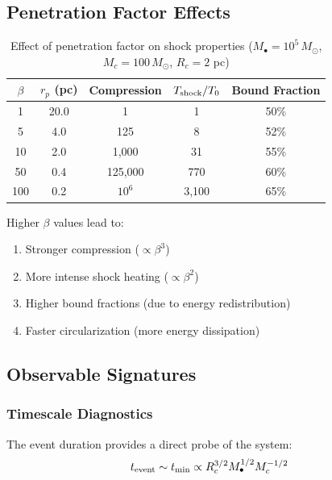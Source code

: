 \documentclass[twocolumn,amsmath,amssymb,prd,superscriptaddress,nofootinbib]{revtex4-2}
\begin{document}
\subsection{Penetration Factor Effects}
\label{sec:beta_effects}

\begin{table}[h]
\centering
\caption{Effect of penetration factor on shock properties ($M_\bullet = 10^5\,M_\odot$, $M_c = 100\,M_\odot$, $R_c = 2$ pc)}
\label{tab:beta_survey}
\begin{tabular}{ccccc}
\toprule
$\beta$ & $r_p$ (pc) & Compression & $T_{\rm shock}/T_0$ & Bound Fraction \\
\midrule
1 & 20.0 & 1 & 1 & 50\% \\
5 & 4.0 & 125 & 8 & 52\% \\
10 & 2.0 & 1,000 & 31 & 55\% \\
50 & 0.4 & 125,000 & 770 & 60\% \\
100 & 0.2 & $10^6$ & 3,100 & 65\% \\
\bottomrule
\end{tabular}
\end{table}

Higher $\beta$ values lead to:
\begin{enumerate}
    \item Stronger compression ($\propto \beta^3$)
    \item More intense shock heating ($\propto \beta^2$)
    \item Higher bound fractions (due to energy redistribution)
    \item Faster circularization (more energy dissipation)
\end{enumerate}

\subsection{Observable Signatures}
\label{sec:observables}

\subsubsection{Timescale Diagnostics}

The event duration provides a direct probe of the system:
\begin{equation}
    t_{\rm event} \sim t_{\rm min} \propto R_c^{3/2} M_\bullet^{1/2} M_c^{-1/2}
\end{equation}
\end{document}
